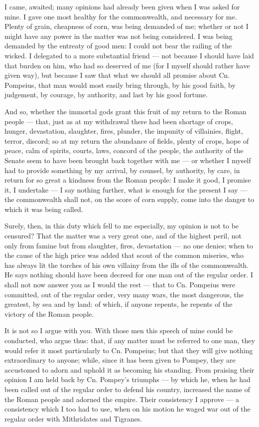  I came, awaited; many opinions had already been given when I was asked for mine. I gave one most healthy for the commonwealth, and necessary for me. Plenty of grain, cheapness of corn, was being demanded of me; whether or not I might have any power in the matter was not being considered. I was being demanded by the entreaty of good men: I could not bear the railing of the wicked. I delegated to a more substantial friend --- not because I should have laid that burden on him, who had so deserved of me (for I myself should rather have given way), but because I saw that what we should all promise about Cn. Pompeius, that man would most easily bring through, by his good faith, by judgement, by courage, by authority, and last by his good fortune.

 And so, whether the immortal gods grant this fruit of my return to the Roman people --- that, just as at my withdrawal there had been shortage of crops, hunger, devastation, slaughter, fires, plunder, the impunity of villainies, flight, terror, discord; so at my return the abundance of fields, plenty of crops, hope of peace, calm of spirits, courts, laws, concord of the people, the authority of the Senate seem to have been brought back together with me --- or whether I myself had to provide something by my arrival, by counsel, by authority, by care, in return for so great a kindness from the Roman people: I make it good, I promise it, I undertake --- I say nothing further, what is enough for the present I say --- the commonwealth shall not, on the score of corn supply, come into the danger to which it was being called.

 Surely, then, in this duty which fell to me especially, my opinion is not to be censured? That the matter was a very great one, and of the highest peril, not only from famine but from slaughter, fires, devastation --- no one denies; when to the cause of the high price was added that scout of the common miseries, who has always lit the torches of his own villainy from the ills of the commonwealth. He says nothing should have been decreed for one man out of the regular order. I shall not now answer you as I would the rest --- that to Cn. Pompeius were committed, out of the regular order, very many wars, the most dangerous, the greatest, by sea and by land: of which, if anyone repents, he repents of the victory of the Roman people.

 It is not so I argue with you. With those men this speech of mine could be conducted, who argue thus: that, if any matter must be referred to one man, they would refer it most particularly to Cn. Pompeius; but that they will give nothing extraordinary to anyone; while, since it has been given to Pompey, they are accustomed to adorn and uphold it as becoming his standing. From praising their opinion I am held back by Cn. Pompey's triumphs --- by which he, when he had been called out of the regular order to defend his country, increased the name of the Roman people and adorned the empire. Their consistency I approve --- a consistency which I too had to use, when on his motion he waged war out of the regular order with Mithridates and Tigranes.

